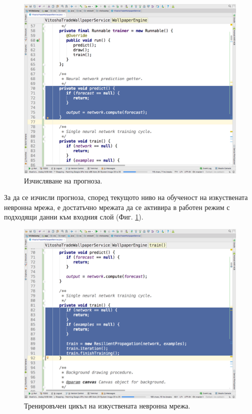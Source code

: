 \documentclass[book,14pt,oneside,openany]{memoir}
\begin{document}
\begin{figure}[h]
  \centering
  \includegraphics[height=0.45\pdfpageheight]{pic0048}
  \caption{Изчисляване на прогноза.}
\label{fig:pic0048}
\end{figure}
\FloatBarrier

За да се изчисли прогноза, според текущото ниво на обученост на изкуствената невронна мрежа, е достатъчно мрежата да се активира в работен режим с подходящи данни към входния слой (Фиг. \ref{fig:pic0048}).

\begin{figure}[h]
  \centering
  \includegraphics[height=0.45\pdfpageheight]{pic0049}
  \caption{Тренировъчен цикъл на изкуствената невронна мрежа.}
\label{fig:pic0049}
\end{figure}
\FloatBarrier
\end{document}
